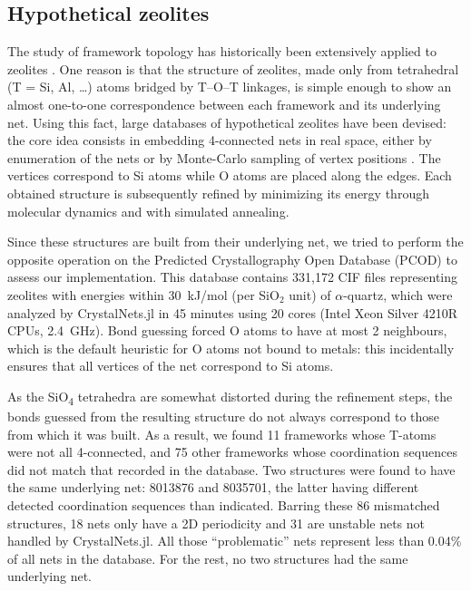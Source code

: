 \documentclass[main.tex]{subfiles}
\begin{document}
\subsection{Hypothetical zeolites}


The study of framework topology has historically been extensively applied to zeolites \autocite{TopochemistryZeolites}. One reason is that the structure of zeolites, made only from tetrahedral (T = Si, Al, \ldots) atoms bridged by T--O--T linkages, is simple enough to show an almost one-to-one correspondence between each framework and its underlying net. Using this fact, large databases of hypothetical zeolites have been devised: the core idea consists in embedding 4-connected nets in real space, either by enumeration of the nets \autocite{Treacy} or by Monte-Carlo sampling of vertex positions \autocite{Deem}. The vertices correspond to Si atoms while O atoms are placed along the edges. Each obtained structure is subsequently refined by minimizing its energy through molecular dynamics and with simulated annealing.

Since these structures are built from their underlying net, we tried to perform the opposite operation on the Predicted Crystallography Open Database (PCOD) \autocite{Deem} to assess our implementation. This database contains 331,172 CIF files representing zeolites with energies within \SI{30}{kJ/mol} (per SiO$_2$ unit) of $\alpha$-quartz, which were analyzed by CrystalNets.jl in 45 minutes using 20 cores (Intel Xeon Silver 4210R CPUs, 2.4~GHz). Bond guessing forced O atoms to have at most 2 neighbours, which is the default heuristic for O atoms not bound to metals: this incidentally ensures that all vertices of the net correspond to Si atoms.

As the \si{SiO_4} tetrahedra are somewhat distorted during the refinement steps, the bonds guessed from the resulting structure do not always correspond to those from which it was built. As a result, we found 11 frameworks whose T-atoms were not all 4-connected, and 75 other frameworks whose coordination sequences did not match that recorded in the database. Two structures were found to have the same underlying net: 8013876 and 8035701, the latter having different detected coordination sequences than indicated.
Barring these 86 mismatched structures, 18 nets only have a 2D periodicity and 31 are unstable nets not handled by CrystalNets.jl. All those ``problematic'' nets represent less than 0.04\% of all nets in the database. For the rest, no two structures had the same underlying net.
\end{document}
